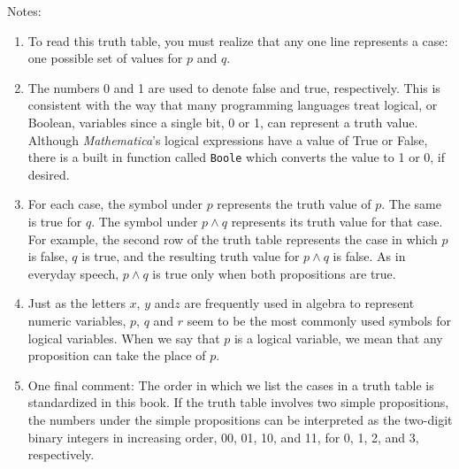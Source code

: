 \documentclass[10pt,]{book}
\theoremstyle{plain}
\theoremstyle{definition}
\theoremstyle{definition}
\theoremstyle{definition}
\theoremstyle{definition}
\begin{document}
Notes:%
\par
\leavevmode%
\begin{enumerate}[label=\alph*]
\item\hypertarget{li-1}{} To read this truth table, you must realize that any one line represents a case: one possible set of values for \(p\) and \(q\).%
\item\hypertarget{li-2}{}The numbers 0 and 1 are used to denote false and true, respectively. This is consistent with the way that many programming languages treat logical, or Boolean, variables since a single bit, 0 or 1, can represent a truth value. Although \emph{ Mathematica}'s logical expressions have a value of True or False, there is a built in function called \lstinline?Boole? which converts the value to 1 or 0, if desired. %
\item\hypertarget{li-3}{}For each case, the symbol under \(p\) represents the truth value of \(p\). The same is true for \(q\). The symbol under \(p \land q\) represents its truth value for that case. For example, the second row of the truth table represents the case in which \(p\) is false, \(q\) is true, and the resulting truth value for \(p \land q\) is false. As in everyday speech, \(p \land q\) is true only when both propositions are true.%
\item\hypertarget{li-4}{}Just as the letters \(x\), \(y\) and\(z\) are frequently used in algebra to represent numeric variables, \(p\), \(q\) and \(r\) seem to be the most commonly used symbols for logical variables. When we say that \(p\) is a logical variable, we mean that any proposition can take the place of \(p\).%
\item\hypertarget{li-5}{}One final comment: The order in which we list the cases in a truth table is standardized in this book. If the truth table involves two simple propositions, the numbers under the simple propositions can be interpreted as the two-digit binary integers in increasing order, 00, 01, 10, and 11, for 0, 1, 2, and 3, respectively.%
\end{enumerate}
\end{document}
